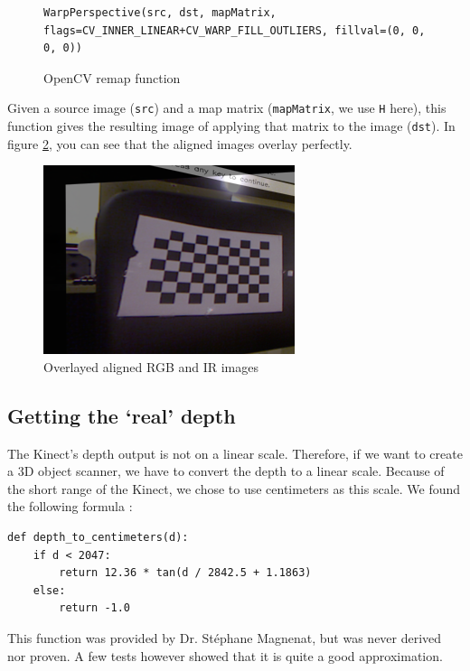\begin{figure}[H]
\begin{lstlisting}
WarpPerspective(src, dst, mapMatrix, flags=CV_INNER_LINEAR+CV_WARP_FILL_OUTLIERS, fillval=(0, 0, 0, 0))
\end{lstlisting}
\caption{OpenCV remap function}
\label{code:warpperspective}
\end{figure}

Given a source image (\verb|src|) and a map matrix (\verb|mapMatrix|, we use \verb|H| here), this function gives the resulting image of applying that matrix to the image (\verb|dst|). In figure \ref{fig:aligned}, you can see that the aligned images overlay perfectly.

\begin{figure}[H]
\centering
\includegraphics[scale=0.6]{images/aligned.png}
\caption{Overlayed aligned RGB and IR images}
\label{fig:aligned}
\end{figure}


\subsection{Getting the `real' depth}
The Kinect's depth output is not on a linear scale. Therefore, if we want to create a 3D object scanner, we have to convert the depth to a linear scale. Because of the short range of the Kinect, we chose to use centimeters as this scale. We found the following formula \cite{MAGNENAT}:
\newpage
\begin{lstlisting}
def depth_to_centimeters(d):
    if d < 2047:
        return 12.36 * tan(d / 2842.5 + 1.1863)
    else:
        return -1.0
\end{lstlisting}
This function was provided by Dr. St\'ephane Magnenat, but was never derived nor proven. A few tests however showed that it is quite a good approximation.

